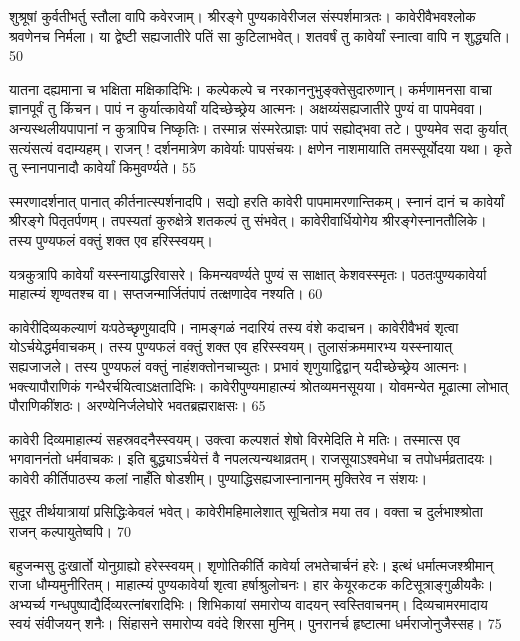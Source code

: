 शुश्रूषां कुर्वतीभर्तु स्तौला वापि कवेरजाम्।
श्रीरङ्गे पुण्यकावेरीजल संस्पर्शमात्रतः।
कावेरीवैभवश्लोक श्रवणेनच निर्मला।
या द्वेष्टी सह्यजातीरे पतिं सा कुटिलाभवेत्।
शतवर्षं तु कावेर्यां स्नात्वा वापि न शुद्ध्यति।
50

यातना दह्यमाना च भक्षिता मक्षिकादिभिः।
कल्पेकल्पे च नरकाननुभुङ्क्तेसुदारुणान्।
कर्मणामनसा वाचा ज्ञानपूर्वं तु किंचन।
पापं न कुर्यात्कावेर्यां यदिच्छेच्छ्रेय आत्मनः।
अक्षय्यंसह्यजातीरे पुण्यं वा पापमेववा।
अन्यस्थलीयपापानां न कुत्रापिच निष्कृतिः।
तस्मान्न संस्मरेत्प्राज्ञः पापं सह्योद्भवा तटे।
पुण्यमेव सदा कुर्यात् सत्यंसत्यं वदाम्यहम्।
राजन् ! दर्शनमात्रेण कावेर्याः पापसंचयः।
क्षणेन नाशमायाति तमस्सूर्योदया यथा।
कृते तु स्नानपानादौ कावेर्यां किमुवर्ण्यते।
55

स्मरणादर्शनात् पानात् कीर्तनात्स्पर्शनादपि।
सद्यो हरति कावेरी पापमामरणान्तिकम्।
स्नानं दानं च कावेर्यां श्रीरङ्गे पितृतर्पणम्।
तपस्यतां कुरुक्षेत्रे शतकल्पं तु संभवेत्।
कावेरीवार्धियोगेय श्रीरङ्गेस्नानतौलिके।
तस्य पुण्यफलं वक्तुं शक्त एव हरिस्स्वयम्।

यत्रकुत्रापि कावेर्यां यस्स्नायाद्धरिवासरे।
किमन्यवर्ण्यते पुण्यं स साक्षात् केशवस्स्मृतः।
पठतःपुण्यकावेर्या माहात्म्यं शृण्वतश्च वा।
सप्तजन्मार्जितंपापं तत्क्षणादेव नश्यति।
60

कावेरीदिव्यकल्याणं यःपठेच्छृणुयादपि।
नामङ्गळं नदारियं तस्य वंशे कदाचन।
कावेरीवैभवं शृत्वा योऽर्चयेद्धर्मवाचकम्।
तस्य पुण्यफलं वक्तुं शक्त एव हरिस्स्वयम्।
तुलासंक्रममारभ्य यस्स्नायात् सह्यजाजले।
तस्य पुण्यफलं वक्तुं नाहंशक्तोनचाच्युतः।
प्रभावं शृणुयाद्विद्वान् यदीच्छेच्छ्रेय आत्मनः।
भक्त्यापौराणिकं गन्धैरर्चयित्वाऽक्षतादिभिः।
कावेरीपुण्यमाहात्म्यं श्रोतव्यमनसूयया।
योवमन्येत मूढात्मा लोभात् पौराणिकींशठः।
अरण्येनिर्जलेघोरे भवतब्रह्मराक्षसः।
65

कावेरी दिव्यमाहात्म्यं सहस्रवदनैस्स्वयम्।
उक्त्वा कल्पशतं शेषो विरमेदिति मे मतिः।
तस्मात्स एव भगवाननंतो धर्मवाचकः।
इति बुद्ध्याऽर्चयेत्तं वै नपलत्यन्यथाव्रतम्।
राजसूयाऽश्वमेधा च तपोधर्मव्रतादयः।
कावेरी कीर्तिपाठस्य कलां नाहँति षोडशीम्।
पुण्याद्धिसह्यजास्नानानम् मुक्तिरेव न संशयः।

सुदूर तीर्थयात्रायां प्रसिद्धिःकेवलं भवेत्।
कावेरीमहिमालेशात् सूचितोत्र मया तव।
वक्ता च दुर्लभाश्श्रोता राजन् कल्पायुतेष्वपि।
70

बहुजन्मसु दुःखार्तो योनुग्राह्यो हरेस्स्वयम्।
शृणोतिकीर्ति कावेर्या लभतेचार्चनं हरेः।
इत्थं धर्मात्मजश्श्रीमान् राजा धौम्यमुनीरितम्।
माहात्म्यं पुण्यकावेर्या शृत्वा हर्षाश्रुलोचनः।
हार केयूरकटक कटिसूत्राङ्गुळीयकैः।
अभ्यर्च्य गन्धपुष्पाद्यैर्दिव्यरत्नांबरादिभिः।
शिभिकायां समारोप्य वादयन् स्वस्तिवाचनम्।
दिव्यचामरमादाय स्वयं संवीजयन् शनैः।
सिंहासने समारोप्य ववंदे शिरसा मुनिम्।
पुनरानर्च हृष्टात्मा धर्मराजोनुजैस्सह।
75

